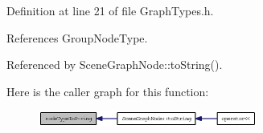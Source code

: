 Definition at line 21 of file GraphTypes.h.

References GroupNodeType.

Referenced by SceneGraphNode::toString().

Here is the caller graph for this function:\nopagebreak
\begin{figure}[H]
\begin{center}
\leavevmode
\includegraphics[width=203pt]{GraphTypes_8h_0d6de0bb6213b4ac98a1e84d679902b6_icgraph}
\end{center}
\end{figure}
